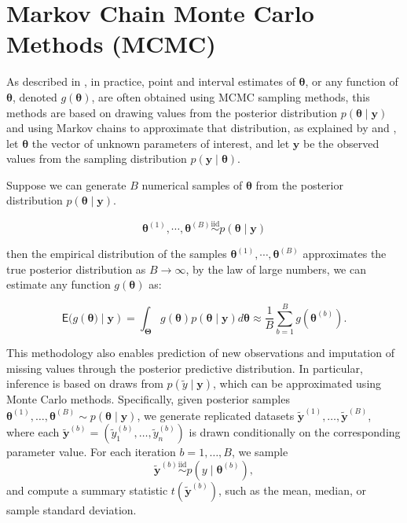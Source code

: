\section{Markov Chain Monte Carlo Methods (MCMC)}

As described in \cite{GAMERMAN}, in practice, point and interval estimates of $\bm{\theta}$, or any function of $\bm{\theta}$, denoted $g(\bm{\theta})$, are often obtained using MCMC sampling methods, this methods are based on drawing values from the posterior distribution $p(\bm{\theta}\mid\bm{y})$ and using Markov chains to approximate that distribution, as explained by \cite{GELMAN14} and \cite{HOFF}, let $\bm{\theta}$ the vector of unknown parameters of interest, and let $\bm{y}$ be the observed values from the sampling distribution $p(\bm{y}\mid\bm{\theta})$.


\newpage
Suppose we can generate $B$ numerical samples of $\bm{\theta}$ from the posterior distribution $p(\bm{\theta}\mid\bm{y})$.

\begin{equation}
\label{MCMC}
\bm{\theta}^{(1)},\cdots,\bm{\theta}^{(B)}\stackrel{\text{iid}}\sim p(\bm{\theta}\mid\bm{y})
\end{equation}


then the empirical distribution of the samples $\bm{\theta}^{(1)},\cdots,\bm{\theta}^{(B)}$ approximates the true posterior distribution as $B\rightarrow\infty$, by the law of large numbers, we can estimate any function $g(\bm{\theta})$ as:

\begin{equation} 
\label{MCMC_g}
\mathsf{E}(g(\bm{\theta)\mid\bm{y}})=\int_{\bm{\Theta}}g(\bm{\theta})p(\bm{\theta}\mid\bm{y})d\bm{\theta}\approx \frac{1}{B}\sum_{b=1}^{B}g(\bm{\theta}^{(b)}).
\end{equation}

\vspace{0.5cm}

This methodology also enables prediction of new observations and imputation of 
missing values through the posterior predictive distribution. In particular, 
inference is based on draws from \( p(\tilde{y}\mid \bm{y}) \), which can be 
approximated using Monte Carlo methods. Specifically, given posterior samples 
\( \bm{\theta}^{(1)}, \dots, \bm{\theta}^{(B)} \sim p(\bm{\theta}\mid \bm{y}) \), 
we generate replicated datasets 
\( \bm{\tilde{y}}^{(1)}, \dots, \bm{\tilde{y}}^{(B)} \), where each 
\( \bm{\tilde{y}}^{(b)} = (\tilde{y}_1^{(b)}, \dots, \tilde{y}_n^{(b)}) \) is drawn 
conditionally on the corresponding parameter value. For each iteration 
\( b = 1, \dots, B \), we sample
\begin{equation}
\bm{\tilde{y}}^{(b)} \stackrel{\text{iid}}{\sim} p(y \mid \bm{\theta}^{(b)}),
\end{equation}
and compute a summary statistic \( t\!\left(\bm{\tilde{y}}^{(b)}\right) \), such as 
the mean, median, or sample standard deviation.

